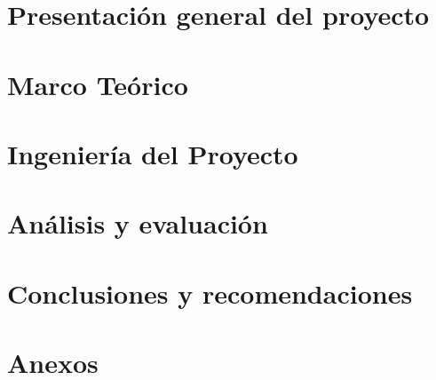\documentclass[letter, oneside, openright, 12pt]{book}
\begin{document}
\mainmatter
\setcounter{page}{1}
\renewcommand*{\thepage}{\arabic{page}}

  \chapter{Presentación general del proyecto}
  

  \chapter{Marco Teórico}
  

  \chapter{Ingeniería del Proyecto}
  
  
  \chapter{Análisis y evaluación}
  

  \chapter{Conclusiones y recomendaciones}
  

  \newpage %
  
  \cleardoublepage
  \nocite{*} %
  


  \setcounter{section}{0} %
  \renewcommand{\thesection}{Anexo \arabic{section}}
  \chapter*{Anexos}
  
\end{document}
